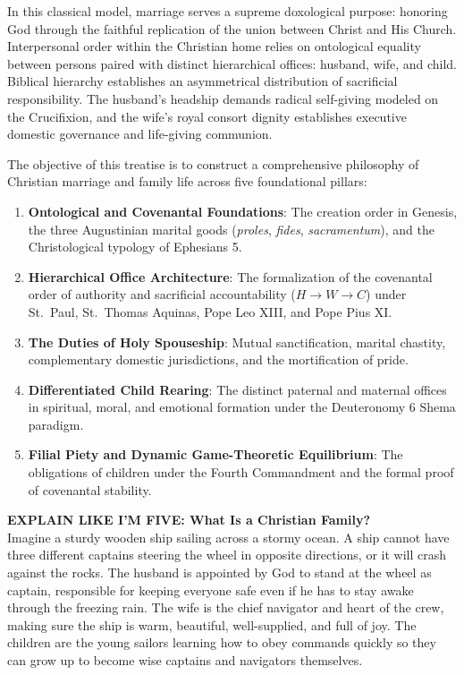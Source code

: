 \documentclass[11pt,twocolumn]{article}
\begin{document}
In this classical model, marriage serves a supreme doxological purpose: honoring God through the faithful replication of the union between Christ and His Church. Interpersonal order within the Christian home relies on ontological equality between persons paired with distinct hierarchical offices: husband, wife, and child. Biblical hierarchy establishes an asymmetrical distribution of sacrificial responsibility. The husband's headship demands radical self-giving modeled on the Crucifixion, and the wife's royal consort dignity establishes executive domestic governance and life-giving communion.

The objective of this treatise is to construct a comprehensive philosophy of Christian marriage and family life across five foundational pillars:
\begin{enumerate}
    \item \textbf{Ontological and Covenantal Foundations}: The creation order in Genesis, the three Augustinian marital goods (\textit{proles}, \textit{fides}, \textit{sacramentum}), and the Christological typology of Ephesians 5.
    \item \textbf{Hierarchical Office Architecture}: The formalization of the covenantal order of authority and sacrificial accountability ($H \to W \to C$) under St.~Paul, St.~Thomas Aquinas, Pope Leo XIII, and Pope Pius XI.
    \item \textbf{The Duties of Holy Spouseship}: Mutual sanctification, marital chastity, complementary domestic jurisdictions, and the mortification of pride.
    \item \textbf{Differentiated Child Rearing}: The distinct paternal and maternal offices in spiritual, moral, and emotional formation under the Deuteronomy 6 Shema paradigm.
    \item \textbf{Filial Piety and Dynamic Game-Theoretic Equilibrium}: The obligations of children under the Fourth Commandment and the formal proof of covenantal stability.
\end{enumerate}

\begin{eli5box}
\textbf{EXPLAIN LIKE I'M FIVE: What Is a Christian Family?}\\
Imagine a sturdy wooden ship sailing across a stormy ocean. A ship cannot have three different captains steering the wheel in opposite directions, or it will crash against the rocks. The husband is appointed by God to stand at the wheel as captain, responsible for keeping everyone safe even if he has to stay awake through the freezing rain. The wife is the chief navigator and heart of the crew, making sure the ship is warm, beautiful, well-supplied, and full of joy. The children are the young sailors learning how to obey commands quickly so they can grow up to become wise captains and navigators themselves.
\end{eli5box}
\end{document}
